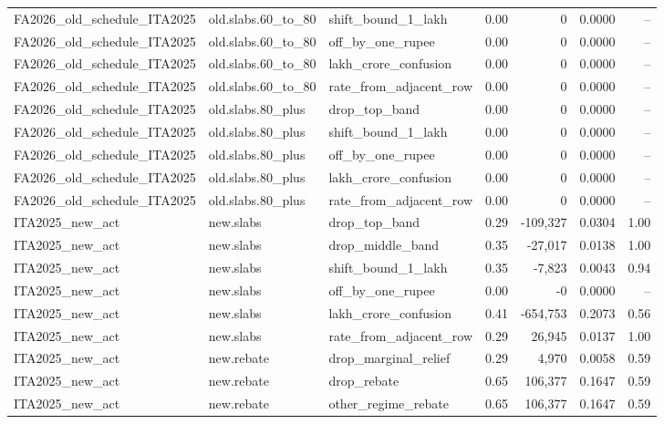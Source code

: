 \begin{table}[t]
\begin{tabular}{lllrrrr}
FA2026\_old\_schedule\_ITA2025 & old.slabs.60\_to\_80 & shift\_bound\_1\_lakh & 0.00 & 0 & 0.0000 & -- \\
FA2026\_old\_schedule\_ITA2025 & old.slabs.60\_to\_80 & off\_by\_one\_rupee & 0.00 & 0 & 0.0000 & -- \\
FA2026\_old\_schedule\_ITA2025 & old.slabs.60\_to\_80 & lakh\_crore\_confusion & 0.00 & 0 & 0.0000 & -- \\
FA2026\_old\_schedule\_ITA2025 & old.slabs.60\_to\_80 & rate\_from\_adjacent\_row & 0.00 & 0 & 0.0000 & -- \\
FA2026\_old\_schedule\_ITA2025 & old.slabs.80\_plus & drop\_top\_band & 0.00 & 0 & 0.0000 & -- \\
FA2026\_old\_schedule\_ITA2025 & old.slabs.80\_plus & shift\_bound\_1\_lakh & 0.00 & 0 & 0.0000 & -- \\
FA2026\_old\_schedule\_ITA2025 & old.slabs.80\_plus & off\_by\_one\_rupee & 0.00 & 0 & 0.0000 & -- \\
FA2026\_old\_schedule\_ITA2025 & old.slabs.80\_plus & lakh\_crore\_confusion & 0.00 & 0 & 0.0000 & -- \\
FA2026\_old\_schedule\_ITA2025 & old.slabs.80\_plus & rate\_from\_adjacent\_row & 0.00 & 0 & 0.0000 & -- \\
ITA2025\_new\_act & new.slabs & drop\_top\_band & 0.29 & -109,327 & 0.0304 & 1.00 \\
ITA2025\_new\_act & new.slabs & drop\_middle\_band & 0.35 & -27,017 & 0.0138 & 1.00 \\
ITA2025\_new\_act & new.slabs & shift\_bound\_1\_lakh & 0.35 & -7,823 & 0.0043 & 0.94 \\
ITA2025\_new\_act & new.slabs & off\_by\_one\_rupee & 0.00 & -0 & 0.0000 & -- \\
ITA2025\_new\_act & new.slabs & lakh\_crore\_confusion & 0.41 & -654,753 & 0.2073 & 0.56 \\
ITA2025\_new\_act & new.slabs & rate\_from\_adjacent\_row & 0.29 & 26,945 & 0.0137 & 1.00 \\
ITA2025\_new\_act & new.rebate & drop\_marginal\_relief & 0.29 & 4,970 & 0.0058 & 0.59 \\
ITA2025\_new\_act & new.rebate & drop\_rebate & 0.65 & 106,377 & 0.1647 & 0.59 \\
ITA2025\_new\_act & new.rebate & other\_regime\_rebate & 0.65 & 106,377 & 0.1647 & 0.59 \\
\bottomrule
\end{tabular}
\end{table}
